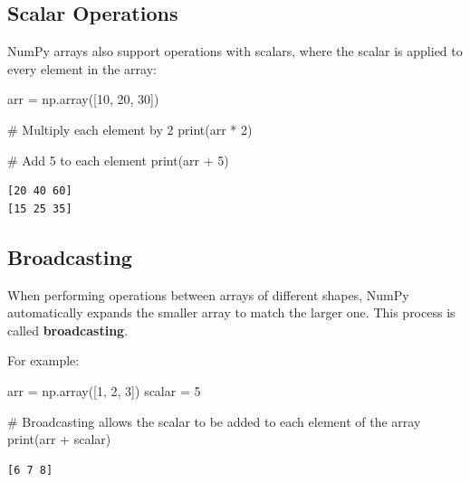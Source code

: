 \documentclass[
  letterpaper,
  DIV=11,
  numbers=noendperiod]{scrreprt}
\newenvironment{Shaded}{\begin{snugshade}}{\end{snugshade}}
\newcommand{\BuiltInTok}[1]{\textcolor[rgb]{0.00,0.23,0.31}{#1}}
\newcommand{\CommentTok}[1]{\textcolor[rgb]{0.37,0.37,0.37}{#1}}
\newcommand{\DecValTok}[1]{\textcolor[rgb]{0.68,0.00,0.00}{#1}}
\newcommand{\NormalTok}[1]{\textcolor[rgb]{0.00,0.23,0.31}{#1}}
\newcommand{\OperatorTok}[1]{\textcolor[rgb]{0.37,0.37,0.37}{#1}}
\begin{document}
\hypertarget{scalar-operations}{%
\subsection{Scalar Operations}\label{scalar-operations}}

NumPy arrays also support operations with scalars, where the scalar is
applied to every element in the array:

\begin{Shaded}
\begin{Highlighting}[]
\NormalTok{arr }\OperatorTok{=}\NormalTok{ np.array([}\DecValTok{10}\NormalTok{, }\DecValTok{20}\NormalTok{, }\DecValTok{30}\NormalTok{])}

\CommentTok{\# Multiply each element by 2}
\BuiltInTok{print}\NormalTok{(arr }\OperatorTok{*} \DecValTok{2}\NormalTok{)  }

\CommentTok{\# Add 5 to each element}
\BuiltInTok{print}\NormalTok{(arr }\OperatorTok{+} \DecValTok{5}\NormalTok{)  }
\end{Highlighting}
\end{Shaded}

\begin{verbatim}
[20 40 60]
[15 25 35]
\end{verbatim}

\hypertarget{broadcasting}{%
\subsection{Broadcasting}\label{broadcasting}}

When performing operations between arrays of different shapes, NumPy
automatically expands the smaller array to match the larger one. This
process is called \textbf{broadcasting}.

For example:

\begin{Shaded}
\begin{Highlighting}[]
\NormalTok{arr }\OperatorTok{=}\NormalTok{ np.array([}\DecValTok{1}\NormalTok{, }\DecValTok{2}\NormalTok{, }\DecValTok{3}\NormalTok{])}
\NormalTok{scalar }\OperatorTok{=} \DecValTok{5}

\CommentTok{\# Broadcasting allows the scalar to be added to each element of the array}
\BuiltInTok{print}\NormalTok{(arr }\OperatorTok{+}\NormalTok{ scalar)  }
\end{Highlighting}
\end{Shaded}

\begin{verbatim}
[6 7 8]
\end{verbatim}
\end{document}
